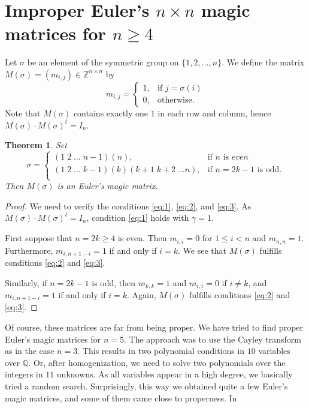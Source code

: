 \documentclass[12pt]{amsart}
\newtheorem{theorem}{Theorem}[section]
\theoremstyle{definition}
\newcommand{\QQ}{\mathbb Q}
\newcommand{\ZZ}{\mathbb Z}
\newcommand*{\set}[1]{\{#1\}}
\begin{document}
\section{\texorpdfstring{Improper Euler's $n\times n$ magic matrices for $n\ge4$}{improper}}\label{n=5}
Let $\sigma$ be an element of the symmetric group on
$\set{1,2,\dots,n}$. We define the matrix
$M(\sigma)=(m_{i,j})\in\ZZ^{n\times n}$ by
\[
  m_{i,j}=
  \begin{cases}
    1,& \text{if } j=\sigma(i)\\
    0,& \text{otherwise.}
  \end{cases}
\]
Note that $M(\sigma)$ contains exactly one $1$ in each row and column,
hence $M(\sigma)\cdot M(\sigma)^t=I_n$.
\begin{theorem}
  Set \[ \sigma=
    \begin{cases}
      (1\;2\;\ldots\;n-1)(n),& \text{if }n\text{ is }even\\
      (1\;2\;\ldots\;k-1)(k)(k+1\;k+2\;\ldots n),& \text{if }n=2k-1%
                                                \text{ is odd.}\\
    \end{cases}
  \]
Then $M(\sigma)$ is an Euler's magic matrix.
\end{theorem}
\begin{proof}
  We need to verify the conditions \eqref{eq:1}, \eqref{eq:2}, and
  \eqref{eq:3}. As $M(\sigma)\cdot M(\sigma)^t=I_n$, condition
  \eqref{eq:1} holds with $\gamma=1$.
  
  First suppose that $n=2k\ge4$ is even. Then $m_{i,i}=0$ for
  $1\le i<n$ and $m_{n,n}=1$. Furthermore, $m_{i,n+1-i}=1$ if and only
  if $i=k$. We see that $M(\sigma)$ fulfills conditions \eqref{eq:2}
  and \eqref{eq:3}.

  Similarly, if $n=2k-1$ is odd, then $m_{k,k}=1$ and $m_{i,i}=0$ if
  $i\ne k$, and $m_{i, n+1-i}=1$ if and only if $i=k$. Again,
  $M(\sigma)$ fulfills conditions \eqref{eq:2} and \eqref{eq:3}.
\end{proof}
Of course, these matrices are far from being proper. We have tried to
find proper Euler's magic matrices for $n=5$. The approach was to use
the Cayley transform as in the case $n=3$. This results in two
polynomial conditions in $10$ variables over $\QQ$. Or, after
homogenization, we need to solve two polynomials over the integers in
$11$ unknowns. As all variables appear in a high degree, we basically
tried a random search. Surprisingly, this way we obtained quite a few
Euler's magic matrices, and some of them came close to properness. In
\end{document}
